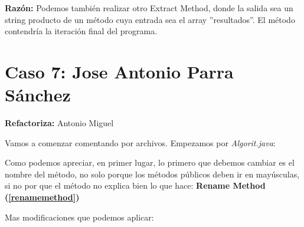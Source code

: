 \documentclass[11pt,a4paper,oneside]{book}
\begin{document}
    \newline
    \textbf{Razón: } Podemos también realizar otro Extract Method, donde la salida sea un string producto de un método cuya entrada sea el array ''resultados''. El método contendría la iteración final del programa.
    



\chapter {Caso 7: Jose Antonio Parra Sánchez}
\textbf{Refactoriza:} Antonio Miguel

Vamos a comenzar comentando por archivos.
Empezamos por \emph{Algorit.java}:



Como podemos apreciar, en primer lugar, lo primero que debemos cambiar es el nombre del método, no solo porque los métodos públicos deben ir en mayúsculas, si no por que el método no explica bien lo que hace: \textbf{Rename Method (\ref{renamemethod})}

\newline
Mas modificaciones que podemos aplicar:
\end{document}
